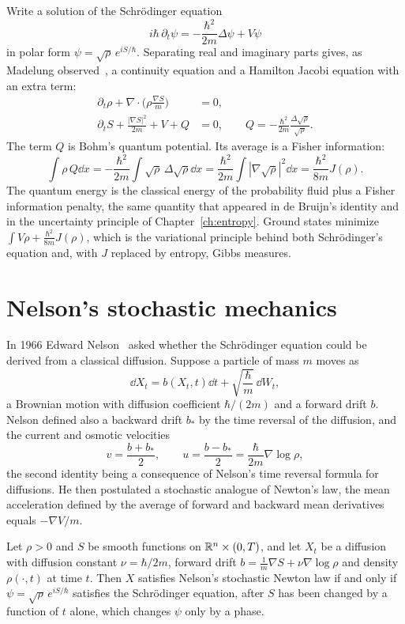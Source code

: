 Write a solution of the Schr\"odinger equation
\[
i\hbar\,\partial_t\psi = -\frac{\hbar^2}{2m}\Delta\psi+V\psi
\]
in polar form $\psi = \sqrt\rho\,e^{iS/\hbar}$. Separating real and imaginary parts gives, as Madelung observed~\cite{madelung1927}, a continuity equation and a Hamilton Jacobi equation with an extra term:
\begin{align*}
\partial_t\rho+\nabla\cdot\Big(\rho\frac{\nabla S}{m}\Big) &= 0,\\
\partial_tS+\frac{|\nabla S|^2}{2m}+V+Q &= 0,\qquad Q = -\frac{\hbar^2}{2m}\frac{\Delta\sqrt\rho}{\sqrt\rho}.
\end{align*}
The term $Q$ is Bohm's quantum potential. Its average is a Fisher information:
\[
\int\rho\,Q\dd x = -\frac{\hbar^2}{2m}\int\sqrt\rho\,\Delta\sqrt\rho\dd x = \frac{\hbar^2}{2m}\int|\nabla\sqrt\rho|^2\dd x = \frac{\hbar^2}{8m}J(\rho).
\]
The quantum energy is the classical energy of the probability fluid plus a Fisher information penalty, the same quantity that appeared in de Bruijn's identity and in the uncertainty principle of Chapter~\ref{ch:entropy}. Ground states minimize $\int V\rho+\frac{\hbar^2}{8m}J(\rho)$, which is the variational principle behind both Schr\"odinger's equation and, with $J$ replaced by entropy, Gibbs measures.

\section{Nelson's stochastic mechanics}

In 1966 Edward Nelson~\cite{nelson1966} asked whether the Schr\"odinger equation could be derived from a classical diffusion. Suppose a particle of mass $m$ moves as
\[
\dd X_t = b(X_t,t)\dd t+\sqrt{\frac\hbar m}\,\dd W_t,
\]
a Brownian motion with diffusion coefficient $\hbar/(2m)$ and a forward drift $b$. Nelson defined also a backward drift $b_*$ by the time reversal of the diffusion, and the current and osmotic velocities
\[
v = \frac{b+b_*}{2},\qquad u = \frac{b-b_*}{2} = \frac{\hbar}{2m}\nabla\log\rho,
\]
the second identity being a consequence of Nelson's time reversal formula for diffusions. He then postulated a stochastic analogue of Newton's law, the mean acceleration defined by the average of forward and backward mean derivatives equals $-\nabla V/m$.

\begin{theorem}[Nelson]
Let $\rho>0$ and $S$ be smooth functions on $\mathbb{R}^n\times(0,T)$, and let $X_t$ be a diffusion with diffusion constant $\nu = \hbar/2m$, forward drift $b = \frac1m\nabla S+\nu\nabla\log\rho$ and density $\rho(\cdot,t)$ at time $t$. Then $X$ satisfies Nelson's stochastic Newton law if and only if $\psi = \sqrt\rho\,e^{iS/\hbar}$ satisfies the Schr\"odinger equation, after $S$ has been changed by a function of $t$ alone, which changes $\psi$ only by a phase.
\end{theorem}

